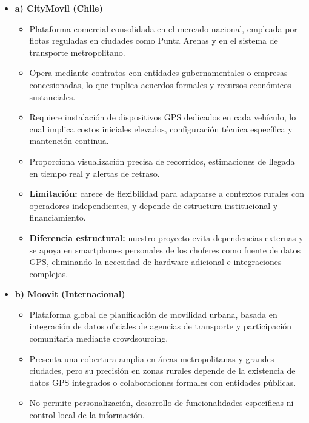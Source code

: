 \documentclass[12pt]{article}
\begin{document}
\begin{itemize}
    \item \textbf{a) CityMovil (Chile)}\\
    \begin{itemize}
        \item     Plataforma comercial consolidada en el mercado nacional, empleada por flotas reguladas en ciudades como Punta Arenas y en el sistema de transporte metropolitano. 

        \item Opera mediante contratos con entidades gubernamentales o empresas concesionadas, lo que implica acuerdos formales y recursos económicos sustanciales. 

        \item Requiere instalación de dispositivos GPS dedicados en cada vehículo, lo cual implica costos iniciales elevados, configuración técnica específica y mantención continua. 

        \item Proporciona visualización precisa de recorridos, estimaciones de llegada en tiempo real y alertas de retraso. 

        \item \textbf{Limitación:} carece de flexibilidad para adaptarse a contextos rurales con operadores independientes, y depende de estructura institucional y financiamiento. 

        \item \textbf{Diferencia estructural:} nuestro proyecto evita dependencias externas y se apoya en smartphones personales de los choferes como fuente de datos GPS, eliminando la necesidad de hardware adicional e integraciones complejas. 
    \end{itemize}
    \newpage
    \item \textbf{b) Moovit (Internacional)}
    \begin{itemize}
        \item     Plataforma global de planificación de movilidad urbana, basada en integración de datos oficiales de agencias de transporte y participación comunitaria mediante crowdsourcing. 

       \item Presenta una cobertura amplia en áreas metropolitanas y grandes ciudades, pero su precisión en zonas rurales depende de la existencia de datos GPS integrados o colaboraciones formales con entidades públicas. 

        \item No permite personalización, desarrollo de funcionalidades específicas ni control local de la información. 


\end{itemize}
\end{itemize}
\end{document}
